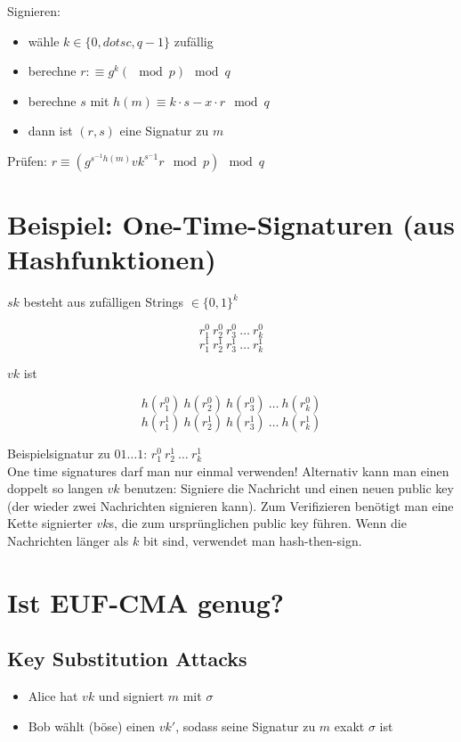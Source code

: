 \documentclass[a4paper,twoside,DIV15,BCOR12mm]{scrbook}
\begin{document}
Signieren:

\begin{itemize}
	\item wähle $k \in \{0, dotsc, q-1\}$ zufällig
	\item berechne $r :\equiv g^k (\mod{p}) \mod{q}$
	\item berechne $s$ mit $h(m) \equiv k\cdot s - x \cdot r \mod{q}$
	\item dann ist $(r,s)$ eine Signatur zu $m$
\end{itemize}

Prüfen: $r \equiv (g^{s^{-1}h(m)} vk^{s^-1}r \mod{p}) \mod{q}$

\section{Beispiel: One-Time-Signaturen (aus Hashfunktionen)}
		
$sk$ besteht aus zufälligen Strings $\in {\{0,1 \}}^k$

$$r_1^0\ r_2^0\ r_3^0\ \ldots\ r_k^0$$
$$r_1^1\ r_2^1\ r_3^1\ \ldots\ r_k^1$$

$vk$ ist

$$h(r_1^0)\ h(r_2^0)\ h(r_3^0)\ \ldots\ h(r_k^0)$$
$$h(r_1^1)\ h(r_2^1)\ h(r_3^1)\ \ldots\ h(r_k^1)$$

Beispielsignatur zu $01\ldots1$: $r_1^0\ r_2^1\ \ldots\ r_k^1$\\

One time signatures darf man nur einmal verwenden! Alternativ kann man einen doppelt so langen $vk$ benutzen: Signiere die Nachricht und einen neuen public key (der wieder zwei Nachrichten signieren kann). Zum Verifizieren benötigt man eine Kette signierter $vk$s, die zum ursprünglichen public key führen. Wenn die Nachrichten länger als $k$ bit sind, verwendet man hash-then-sign.

\section{Ist EUF-CMA genug?}

\subsection{Key Substitution Attacks}

\begin{itemize}
	\item Alice hat $vk$ und signiert $m$ mit $\sigma$
	\item Bob wählt (böse) einen $vk'$, sodass seine Signatur zu $m$ exakt $\sigma$ ist
\end{itemize}
\end{document}
